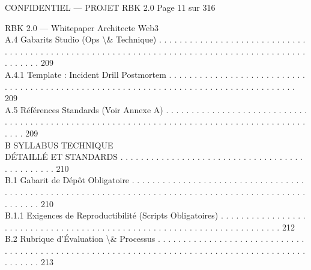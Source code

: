 \documentclass[12pt,landscape,a4paper]{article}
\newenvironment{confidential}
{\begin{tcolorbox}[
    colback=rbkred!5!white,
    colframe=rbkred!75!black,
    title=CONFIDENTIEL,
    fonttitle=\bfseries\color{white},
    coltitle=rbkred!75!black,
    breakable,
    enhanced,
    frame hidden,
    borderline west={2pt}{0pt}{rbkred!75!black}
]}
{\end{tcolorbox}}
\begin{document}
\vspace{0.5em}
\vspace{0.5em}
\vspace{0.5em}
\vspace{0.5em}
\begin{confidential}CONFIDENTIEL — PROJET RBK 2.0                                                                               Page 11 sur 316\end{confidential}
RBK 2.0 — Whitepaper Architecte Web3\\
\vspace{0.5em}
\vspace{0.5em}
A.4     Gabarits Studio (Ops \textbackslash{}& Technique) . . . . . . . . . . . . . . . . . . . . . . . . . . . . . . . . . . . . . . . . . . . . . . . . . . . . . . . . . . . . . . . . . . . . . . . . . . . . . . . . . . . . . . . . . . . . . . . 209\\
A.4.1              Template : Incident Drill Postmortem . . . . . . . . . . . . . . . . . . . . . . . . . . . . . . . . . . . . . . . . . . . . . . . . . . . . . . . . . . . . . . . . . . . . . . . . . . . . . . . . . . . . 209\\
A.5     Références Standards (Voir Annexe A) . . . . . . . . . . . . . . . . . . . . . . . . . . . . . . . . . . . . . . . . . . . . . . . . . . . . . . . . . . . . . . . . . . . . . . . . . . . . . . . . . . . . . . . . . . . 209\\
\vspace{0.5em}
B     SYLLABUS TECHNIQUE\\
DÉTAILLÉ ET STANDARDS . . . . . . . . . . . . . . . . . . . . . . . . . . . . . . . . . . . . . . . . . . . . . . 210\\
B.1     Gabarit de Dépôt Obligatoire . . . . . . . . . . . . . . . . . . . . . . . . . . . . . . . . . . . . . . . . . . . . . . . . . . . . . . . . . . . . . . . . . . . . . . . . . . . . . . . . . . . . . . . . . . . . . . . . . . . . 210\\
B.1.1              Exigences de Reproductibilité (Scripts Obligatoires) . . . . . . . . . . . . . . . . . . . . . . . . . . . . . . . . . . . . . . . . . . . . . . . . . . . . . . . . . . . . . . . . . . . . . . . 212\\
B.2     Rubrique d’Évaluation \textbackslash{}& Processus . . . . . . . . . . . . . . . . . . . . . . . . . . . . . . . . . . . . . . . . . . . . . . . . . . . . . . . . . . . . . . . . . . . . . . . . . . . . . . . . . . . . . . . . . . . . . . . 213\\
\end{document}
